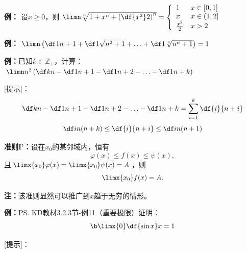 {\bf 例：} 设$x\geq 0$，则
$\limn\sqrt[n]{1+x^n+\left(\df{x^2}2\right)^n}=
\left\{\begin{array}{ll}
1&x\in[0,1]\\ x & x\in(1,2]\\ \frac{x^2}2& x>2
\end{array}\right.$

{\bf 例：} $\limn\left(\df1{n+1}+\df1{\sqrt{n^2+1}}+\ldots
+\df1{\sqrt[n]{n^n+1}}\right)=1$

{\bf 例：}已知$k\in\mathbb{Z}_+$，计算：$\limn n^2\left(\df kn-\df1{n+1}-\df1{n+2}
-\ldots-\df1{n+k}\right)$

[提示]：
$$\df kn-\df1{n+1}-\df1{n+2}-\ldots-\df1{n+k}=\sum\limits_{i=1}^k\df{i}{n+i}$$
$$\df i{n(n+k)}\leq\df{i}{n+i}\leq\df i{n(n+1)}$$

{\bf 准则I'：}设在$x_0$的某邻域内，恒有
$$\varphi(x)\leq f(x)\leq\psi(x), $$
且$\limx{x_0}\varphi(x)=\limx{x_0}\psi(x)=A$，则
$$\limx{x_0}f(x)=A.$$

{\bf 注：}该准则显然可以推广到$x$趋于无穷的情形。

{\bf 例：}\ps{KD教材3.2.3节-例11}（重要极限）证明：
$$\b\limx{0}\df {\sin x}x=1$$

{[提示]}：
\begin{center}
\end{center}

